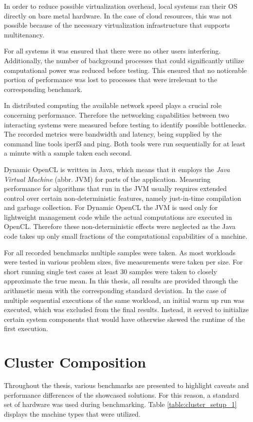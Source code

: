 In order to reduce possible virtualization overhead, local systems ran their OS directly on bare metal hardware. In the case of cloud resources, this was not possible because of the necessary virtualization infrastructure that supports multitenancy.

For all systems it was ensured that there were no other users interfering. Additionally, the number of background processes that could significantly utilize computational power was reduced before testing. This ensured that no noticeable portion of performance was lost to processes that were irrelevant to the corresponding benchmark.

In distributed computing the available network speed plays a crucial role concerning performance\cite{overview_distributed}. Therefore the networking capabilities between two interacting systems were measured before testing to identify possible bottlenecks. The recorded metrics were bandwidth and latency, being supplied by the command line tools iperf3 and ping. Both tools were run sequentially for at least a minute with a sample taken each second.

Dynamic OpenCL is written in Java, which means that it employs the \textit{Java Virtual Machine} (abbr. JVM) for parts of the application. Measuring performance for algorithms that run in the JVM usually requires extended control over certain non-deterministic features, namely just-in-time compilation and garbage collection\cite{rigorous_java}. For Dynamic OpenCL the JVM is used only for lightweight management code while the actual computations are executed in OpenCL. Therefore these non-deterministic effects were neglected as the Java code takes up only small fractions of the computational capabilities of a machine.

For all recorded benchmarks multiple samples were taken. As most workloads were tested in various problem sizes, five measurements were taken per size. For short running single test cases at least 30 samples were taken to closely approximate the true mean\cite{measuring_computer_performance}. In this thesis, all results are provided through the arithmetic mean with the corresponding standard deviation. In the case of multiple sequential executions of the same workload, an initial warm up run was executed, which was excluded from the final results. Instead, it served to initialize certain system components that would have otherwise skewed the runtime of the first execution.

\section{Cluster Composition}
\label{cluster_composition}
Throughout the thesis, various benchmarks are presented to highlight caveats and performance differences of the showcased solutions. For this reason, a standard set of hardware was used during benchmarking. Table \ref{table:cluster_setup_1} displays the machine types that were utilized.

